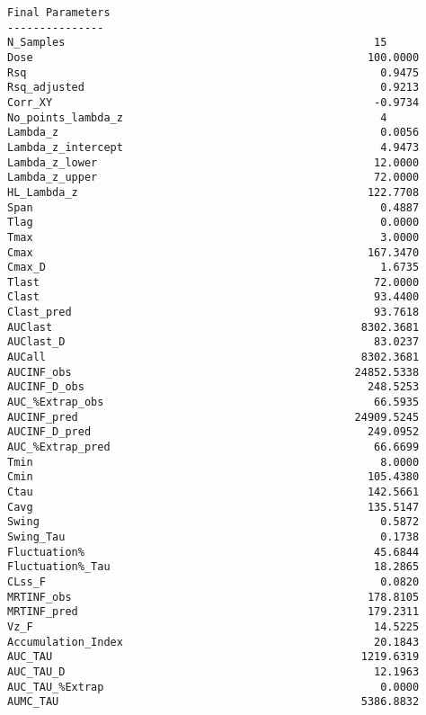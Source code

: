 \documentclass[12pt,a4paper]{article}
\begin{document}
\begin{verbatim}
Final Parameters
---------------
N_Samples                                                15
Dose                                                    100.0000
Rsq                                                       0.9475
Rsq_adjusted                                              0.9213
Corr_XY                                                  -0.9734
No_points_lambda_z                                        4
Lambda_z                                                  0.0056
Lambda_z_intercept                                        4.9473
Lambda_z_lower                                           12.0000
Lambda_z_upper                                           72.0000
HL_Lambda_z                                             122.7708
Span                                                      0.4887
Tlag                                                      0.0000
Tmax                                                      3.0000
Cmax                                                    167.3470
Cmax_D                                                    1.6735
Tlast                                                    72.0000
Clast                                                    93.4400
Clast_pred                                               93.7618
AUClast                                                8302.3681
AUClast_D                                                83.0237
AUCall                                                 8302.3681
AUCINF_obs                                            24852.5338
AUCINF_D_obs                                            248.5253
AUC_%Extrap_obs                                          66.5935
AUCINF_pred                                           24909.5245
AUCINF_D_pred                                           249.0952
AUC_%Extrap_pred                                         66.6699
Tmin                                                      8.0000
Cmin                                                    105.4380
Ctau                                                    142.5661
Cavg                                                    135.5147
Swing                                                     0.5872
Swing_Tau                                                 0.1738
Fluctuation%                                             45.6844
Fluctuation%_Tau                                         18.2865
CLss_F                                                    0.0820
MRTINF_obs                                              178.8105
MRTINF_pred                                             179.2311
Vz_F                                                     14.5225
Accumulation_Index                                       20.1843
AUC_TAU                                                1219.6319
AUC_TAU_D                                                12.1963
AUC_TAU_%Extrap                                           0.0000
AUMC_TAU                                               5386.8832




\end{verbatim}
\end{document}
